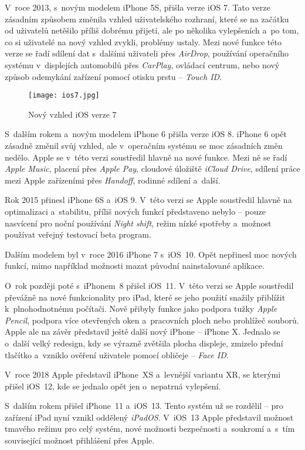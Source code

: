 V~roce 2013, s~novým modelem iPhone 5S, přišla verze iOS 7. Tato verze zásadním způsobem změnila vzhled uživatelského rozhraní, které se na začátku od uživatelů netěšilo příliš dobrému přijetí, ale po několika vylepšeních a~po tom, co si uživatelé na nový vzhled zvykli, problémy ustaly. Mezi nové funkce této verze se řadí sdílení dat s~dalšími uživateli přes \emph{AirDrop}, používání operačního systému v~displejích automobilů přes \emph{CarPlay}, ovládací centrum, nebo nový způsob odemykání zařízení pomocí otisku prstu – \emph{Touch ID}.

\begin{figure}[h]
	\centering
	\texttt{[image: ios7.jpg]}
	\caption{Nový vzhled iOS verze 7 \cite{ios-7-design}}
\end{figure}

S~dalším rokem a~novým modelem iPhone 6 přišla verze iOS 8. iPhone 6 opět zásadně změnil svůj vzhled, ale v~operačním systému se moc zásadních změn nedělo. Apple se v~této verzi soustředil hlavně na nové funkce. Mezi ně se řadí \emph{Apple Music}, placení přes \emph{Apple Pay}, cloudové úložiště \emph{iCloud Drive}, sdílení práce mezi Apple zařízeními přes \emph{Handoff}, rodinné sdílení a~další.

Rok 2015 přinesl iPhone 6S a~iOS 9. V~této verzi se Apple soustředil hlavně na optimalizaci a~stabilitu, příliš nových funkcí představeno nebylo – pouze nasvícení pro noční používání \emph{Night shift}, režim nízké spotřeby a~možnost používat veřejný testovací beta program.

Dalším modelem byl v~roce 2016 iPhone 7 s~iOS~10. Opět nepřinesl moc nových funkcí, mimo například možnosti mazat původní nainstalované aplikace.

O~rok později poté s~iPhonem~8 přišel iOS~11. V~této verzi se Apple soustředil převážně na nové funkcionality pro iPad, které se jeho použití snažily přiblížit k~plnohodnotnému počítači. Nově přibyly funkce jako podpora tužky \emph{Apple Pencil}, podpora více otevřených oken a~pracovních ploch nebo prohlížeč souborů. Apple ale na závěr představil ještě další nový iPhone – iPhone X. Jednalo se o~další velký redesign, kdy se výrazně zvětšila plocha displeje, zmizelo přední tlačítko a~vzniklo ověření uživatele pomocí obličeje – \emph{Face ID}.

V~roce 2018 Apple představil iPhone~XS a~levnější variantu XR, se kterými přišel iOS~12, kde se jednalo opět jen o~nepatrná vylepšení. 

S~dalším rokem přišel iPhone~11 a~iOS~13. Tento systém už se rozdělil – pro zařízení iPad nyní vznikl oddělený \emph{iPadOS}. V~iOS~13 Apple představil možnost tmavého režimu pro celý systém, nové možnosti bezpečnosti a~soukromí a~s~tím související možnost přihlášení přes Apple.

